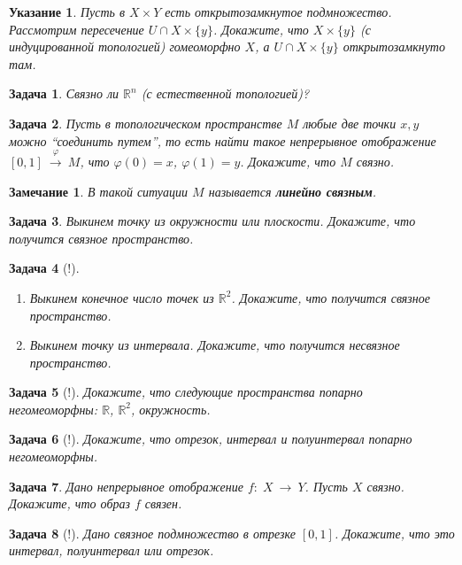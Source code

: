 \documentclass[12pt]{book}
\newcommand{\arrow}{{\:\longrightarrow\:}}
\renewcommand{\phi}{\varphi}
\def\R{{\mathbb R}}
\theoremstyle{upshape}
\newtheorem{zadacha}{Задача}[chapter]
\theoremstyle{generic}
\theoremstyle{upshapenonumber}
\newtheorem{ukazanie}{Указание}[section]
\newtheorem{zamechanie}{Замечание}[chapter]
\newcommand{\следствие}{%
     \refstepcounter{teorema}
     {\noindent\bf Следствие \thechapter.\arabic{teorema}:\ }}
\newcommand{\пример}{%
     \refstepcounter{teorema}
     {\noindent\bf Пример \thechapter.\arabic{teorema}:\ }}
\newcommand{\лемма}{%
     \refstepcounter{teorema}
     {\noindent\bf Лемма \thechapter.\arabic{teorema}:\ }}
\newcommand{\теорема}{%
     \refstepcounter{teorema}
     {\noindent\bf Теорема \thechapter.\arabic{teorema}:\ }}
\newcommand{\утверждение}{%
     \refstepcounter{teorema}
     {\noindent\bf Утверждение \thechapter.\arabic{teorema}:\ }}
\def\ит{\it}
\def\итем{\item %
}
\begin{document}
{\begin{ukazanie}
Пусть в $X\times Y$ есть открытозамкнутое подмножество.
Рассмотрим пересечение $U\cap X\times \{y\}$. Докажите, что
$X\times \{y\}$ (с индуцированной топологией) гомеоморфно
$X$, а $U\cap X\times \{y\}$ открытозамкнуто там.
\end{ukazanie}

\begin{zadacha}
Связно ли $\R^n$ (с естественной топологией)?
\end{zadacha}

\begin{zadacha}
Пусть в топологическом пространстве
$M$ любые две точки $x, y$ можно ``соединить путем'',
то есть найти такое непрерывное отображение
$[0,1] \stackrel \phi \arrow M$, что
$\phi(0)=x$, $\phi(1)=y$. Докажите, что
$M$ связно.
\end{zadacha}

\begin{zamechanie} В такой ситуации $M$ называется
{\bf линейно связным}. \end{zamechanie}

\begin{zadacha}
Выкинем точку из окружности или плоскости.
Докажите, что получится связное пространство.
\end{zadacha}

\begin{zadacha}[!]
\begin{enumerate} \итем Выкинем конечное число точек из $\R^2$.
Докажите, что получится связное пространство.

\итем Выкинем точку из интервала. 
Докажите, что получится несвязное пространство.
\end{enumerate}
\end{zadacha}

\begin{zadacha}[!]
Докажите, что следующие пространства попарно
негомеоморфны: $\R$, $\R^2$, окружность.
\end{zadacha}

\begin{zadacha}[!]
Докажите, что
отрезок, интервал и полуинтервал попарно негомеоморфны.
\end{zadacha}

\begin{zadacha}
Дано непрерывное отображение
$f:\; X \arrow Y$. Пусть $X$ связно.
Докажите, что образ $f$ связен.
\end{zadacha}

\begin{zadacha}[!]
Дано связное подмножество в отрезке $[0,1]$.
Докажите, что это интервал, полуинтервал или отрезок.
\end{zadacha}

}
\end{document}
